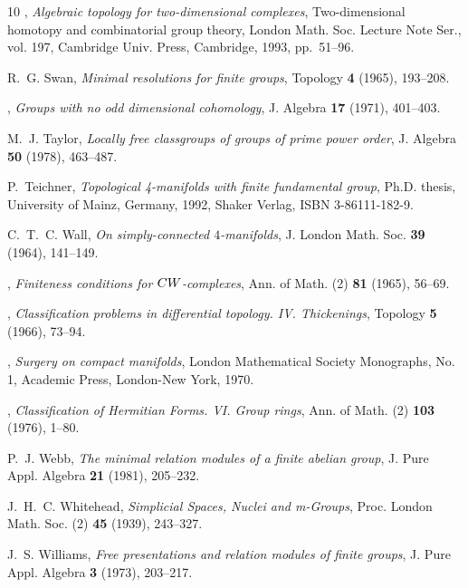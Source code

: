 \documentclass[11pt,a4paper,leqno]{amsart}
\theoremstyle{definition}
\theoremstyle{remark}
\begin{document}
\begin{thebibliography}{10}
\bysame, \emph{Algebraic topology for two-dimensional complexes},
  Two-dimensional homotopy and combinatorial group theory, London Math. Soc.
  Lecture Note Ser., vol. 197, Cambridge Univ. Press, Cambridge, 1993,
  pp.~51--96.

R.~G. Swan, \emph{Minimal resolutions for finite groups}, Topology \textbf{4}
  (1965), 193--208.

\bysame, \emph{Groups with no odd dimensional cohomology}, J. Algebra
  \textbf{17} (1971), 401--403.

M.~J. Taylor, \emph{Locally free classgroups of groups of prime power order},
  J. Algebra \textbf{50} (1978), 463--487.

P.~Teichner, \emph{Topological 4-manifolds with finite fundamental group},
  Ph.D. thesis, University of Mainz, Germany, 1992, Shaker Verlag, ISBN
  3-86111-182-9.

C.~T.~C. Wall, \emph{On simply-connected {$4$}-manifolds}, J. London Math. Soc.
  \textbf{39} (1964), 141--149.

\bysame, \emph{Finiteness conditions for {${\rm CW}$}-complexes}, Ann. of Math.
  (2) \textbf{81} (1965), 56--69.

\bysame, \emph{Classification problems in differential topology. {IV}.
  {T}hickenings}, Topology \textbf{5} (1966), 73--94.

\bysame, \emph{Surgery on compact manifolds}, London Mathematical Society
  Monographs, No. 1, Academic Press, London-New York, 1970.

\bysame, \emph{Classification of {H}ermitian {F}orms. {VI}. {G}roup rings},
  Ann. of Math. (2) \textbf{103} (1976), 1--80.

P.~J. Webb, \emph{The minimal relation modules of a finite abelian group}, J.
  Pure Appl. Algebra \textbf{21} (1981), 205--232.

J.~H.~C. Whitehead, \emph{Simplicial {S}paces, {N}uclei and m-{G}roups}, Proc.
  London Math. Soc. (2) \textbf{45} (1939), 243--327.

J.~S. Williams, \emph{Free presentations and relation modules of finite
  groups}, J. Pure Appl. Algebra \textbf{3} (1973), 203--217.

\end{thebibliography}
\end{document}
